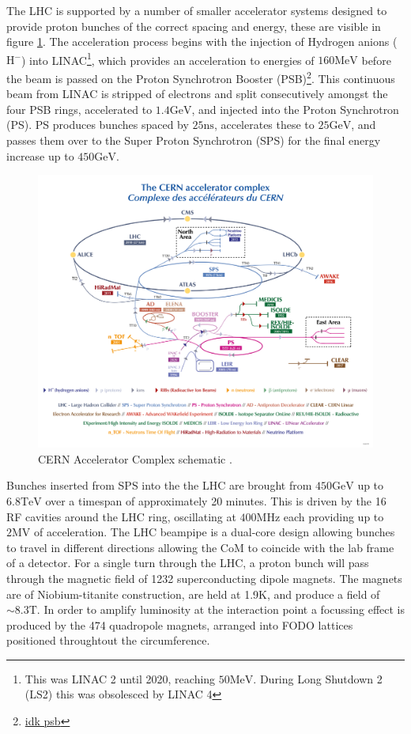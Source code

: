The LHC is supported by a number of smaller accelerator systems designed to provide proton bunches of the correct spacing and energy, these are visible in figure \ref{fig:accel_complex}. The acceleration process begins with the injection of Hydrogen anions ($\text{H}^{-}$) into LINAC\footnote{This was LINAC 2 until 2020, reaching $50\text{MeV}$. During Long Shutdown 2 (LS2) this was obsolesced by LINAC 4}, which provides an acceleration to energies of $160\text{MeV}$ before the beam is passed on the Proton Synchrotron Booster (PSB)\footnote{\href{https://cds.cern.ch/journal/CERNBulletin/2016/32/News\%20Articles/2201549?ln=en}{idk psb}}. This continuous beam from LINAC is stripped of electrons and split consecutively amongst the four PSB rings, accelerated to $1.4\text{GeV}$, and injected into the Proton Synchrotron (PS). PS produces bunches spaced by $25\text{ns}$, accelerates these to $25\text{GeV}$, and passes them over to the Super Proton Synchrotron (SPS) for the final energy increase up to $450\text{GeV}$.
\begin{figure}[!h]
    \centering
    \includegraphics[]{figures/lhc_and_atlas/CCC-v2022.png}
    \caption{CERN Accelerator Complex schematic \cite{lopienska2022}. }
    \label{fig:accel_complex}
\end{figure}
Bunches inserted from SPS into the the LHC are brought from $450\text{GeV}$ up to $6.8\text{TeV}$ over a timespan of approximately 20 minutes. This is driven by the 16 RF cavities around the LHC ring, oscillating at $400\text{MHz}$ each providing up to $2\text{MV}$ of acceleration. The LHC beampipe is a dual-core design allowing bunches to travel in different directions allowing the CoM to coincide with the lab frame of a detector. For a single turn through the LHC, a proton bunch will pass through the magnetic field of 1232 superconducting dipole magnets. The magnets are of Niobium-titanite construction, are held at 1.9K, and produce a field of $\sim8.3\text{T}$. In order to amplify luminosity at the interaction point a focussing effect is produced by the 474 quadropole magnets, arranged into FODO lattices positioned throughtout the circumference.


